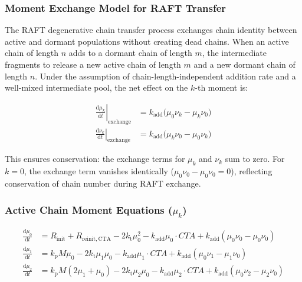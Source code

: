\documentclass[journal=mamobx,manuscript=suppinfo]{achemso}
\begin{document}
\subsubsection{Moment Exchange Model for RAFT Transfer}

The RAFT degenerative chain transfer process exchanges chain identity between
active and dormant populations without creating dead chains. When an active
chain of length $n$ adds to a dormant chain of length $m$, the intermediate
fragments to release a new active chain of length $m$ and a new dormant chain
of length $n$. Under the assumption of chain-length-independent addition rate
and a well-mixed intermediate pool, the net effect on the $k$-th moment is:

\begin{align}
  \left.\frac{\mathrm{d}\mu_k}{\mathrm{d}t}\right|_{\mathrm{exchange}}
    &= k_{\mathrm{add}} \bigl( \mu_0 \nu_k - \mu_k \nu_0 \bigr)
    \label{eq:exchange_mu} \\[6pt]
  \left.\frac{\mathrm{d}\nu_k}{\mathrm{d}t}\right|_{\mathrm{exchange}}
    &= k_{\mathrm{add}} \bigl( \mu_k \nu_0 - \mu_0 \nu_k \bigr)
    \label{eq:exchange_nu}
\end{align}

\noindent This ensures conservation: the exchange terms for $\mu_k$ and $\nu_k$
sum to zero. For $k = 0$, the exchange term vanishes identically
($\mu_0 \nu_0 - \mu_0 \nu_0 = 0$), reflecting conservation of chain number
during RAFT exchange.

\subsubsection{Active Chain Moment Equations ($\mu_k$)}

\begin{align}
  \frac{\mathrm{d}\mu_0}{\mathrm{d}t}
    &= R_{\mathrm{init}} + R_{\mathrm{reinit,CTA}}
       - 2 k_{\mathrm{t}} \mu_0^2
       - k_{\mathrm{add}} \mu_0 \cdot \mathit{CTA}
       + k_{\mathrm{add}} (\mu_0 \nu_0 - \mu_0 \nu_0)
    \label{eq:dmu0} \\[6pt]
  \frac{\mathrm{d}\mu_1}{\mathrm{d}t}
    &= k_{\mathrm{p}} M \mu_0
       - 2 k_{\mathrm{t}} \mu_1 \mu_0
       - k_{\mathrm{add}} \mu_1 \cdot \mathit{CTA}
       + k_{\mathrm{add}} (\mu_0 \nu_1 - \mu_1 \nu_0)
    \label{eq:dmu1} \\[6pt]
  \frac{\mathrm{d}\mu_2}{\mathrm{d}t}
    &= k_{\mathrm{p}} M (2\mu_1 + \mu_0)
       - 2 k_{\mathrm{t}} \mu_2 \mu_0
       - k_{\mathrm{add}} \mu_2 \cdot \mathit{CTA}
       + k_{\mathrm{add}} (\mu_0 \nu_2 - \mu_2 \nu_0)
    \label{eq:dmu2}
\end{align}
\end{document}

